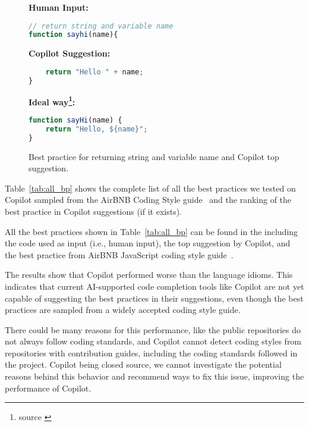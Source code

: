 \begin{figure}[hbt!]
    \centering
\begin{tcolorbox}[title=Return string and variable name,boxsep=.15mm]
\textbf{Human Input:}
\begin{lstlisting}[language=JavaScript]
// return string and variable name
function sayhi(name){
\end{lstlisting}
\tcbline
\textbf{Copilot Suggestion:}
\begin{lstlisting}[language=JavaScript,escapechar=\%]
% \noindent\textcolor{gray}{function sayhi(name)\{ } %
    return "Hello " + name;
}
\end{lstlisting}
\tcbline
\textbf{Ideal way\footnote{source \cite{airbnb_code}}:}
\begin{lstlisting}[language=JavaScript]
function sayHi(name) {
    return "Hello, ${name}";
}
\end{lstlisting}
\end{tcolorbox}
    \caption{Best practice for returning string and variable name and Copilot top suggestion.}
    \label{fig:bp_3}
\end{figure}

Table~\ref{tab:all_bp} shows the complete list of all the best practices we tested on Copilot sampled from the AirBNB Coding Style guide~\cite{airbnb_code} and the ranking of the best practice in Copilot suggestions (if it exists).

All the best practices shown in Table~\ref{tab:all_bp} can be found in the \repl{} including the code used as input (i.e., human input), the top suggestion by Copilot, and the best practice from AirBNB JavaScript coding style guide~\cite{airbnb_code}.

The results show that Copilot performed worse than the language idioms. This indicates that current AI-supported
code completion tools like Copilot are not yet capable of suggesting the best practices in their suggestions, even though the best practices are sampled from a widely accepted coding style guide.

There could be many reasons for this performance, like the public repositories do not always follow coding standards, and Copilot cannot detect coding styles from repositories with contribution guides, including the coding standards followed in the project. 
Copilot being closed source, we cannot investigate the potential reasons behind this behavior and recommend ways to fix this issue, improving the performance of Copilot.

